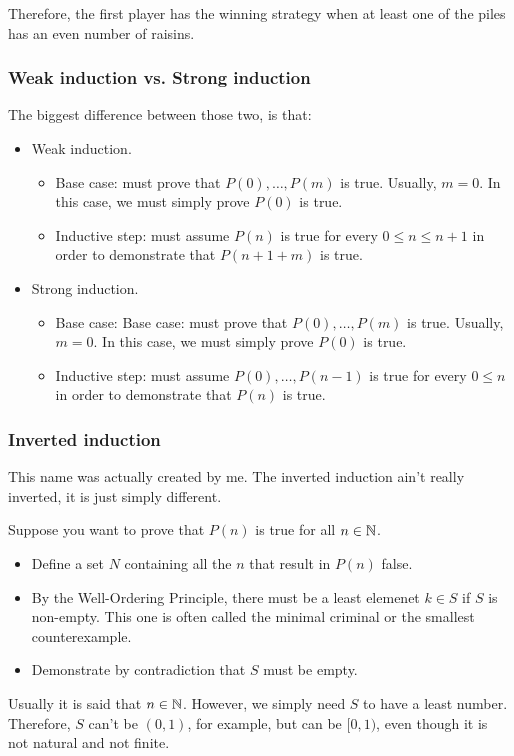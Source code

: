 Therefore, the first player has the winning strategy when at least one of the piles has an even number of raisins.
\subsubsection{Weak induction vs. Strong induction}
The biggest difference between those two, is that:
\begin{itemize}
	\item Weak induction.
	      \begin{itemize}
		      \item Base case: must prove that $P(0), \dots, P(m)$ is true. Usually, $m=0$. In this case,
		            we must simply prove $P(0)$ is true.
		      \item Inductive step: must assume $P(n)$ is true for every $0 \le n \le n+1$ in order to demonstrate that $P(n+1+m)$ is true.
	      \end{itemize}
	\item Strong induction.
	      \begin{itemize}
		      \item Base case: Base case: must prove that $P(0), \dots, P(m)$ is true. Usually, $m=0$. In this case,
		            we must simply prove $P(0)$ is true.
		      \item Inductive step: must assume $P(0), \dots, P(n-1)$ is true for every $0 \le n$ in order to demonstrate that $P(n)$ is true.
	      \end{itemize}
\end{itemize}

\subsubsection{Inverted induction}
This name was actually created by me. The inverted induction ain't really inverted, it is just simply different.

Suppose you want to prove that $P(n)$ is true for all $n\in \mathbb{N}$.
\begin{itemize}
	\item Define a set $N$ containing all the $n$ that result in $P(n)$ false.
	\item By the Well-Ordering Principle, there must be a least elemenet $k\in S$ if $S$ is non-empty. This one is often called the minimal criminal or the smallest counterexample.
	\item Demonstrate by contradiction that $S$ must be empty.
\end{itemize}
Usually it is said that $n\in\mathbb{N}$. However, we simply need $S$ to have a least number. Therefore, $S$ can't be $(0,1)$, for example, but can be
$[0,1)$, even though it is not natural and not finite.


